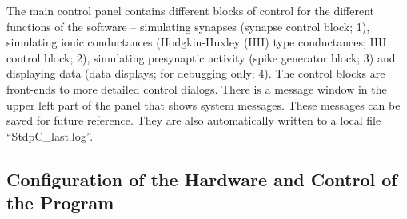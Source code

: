 \documentclass{article}
\begin{document}
The main control panel contains different blocks of control for the
different functions of the software -- simulating synapses (synapse
control block; 1), simulating ionic conductances (Hodgkin-Huxley (HH)
type conductances; HH control block; 2), simulating presynaptic
activity (spike generator block; 3) and displaying data (data
displays; for debugging only; 4). The control blocks are front-ends to
more detailed control dialogs. There is a message window in the upper
left part of the panel that shows system messages. These messages can
be saved for future reference. They are also automatically written to
a local file ``StdpC\_last.log''.


\subsection{Configuration of the Hardware and Control of the Program}
\end{document}
